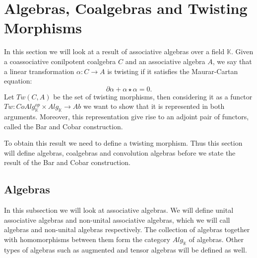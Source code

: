 \documentclass[../../thesis.tex]{subfiles}
\begin{document}
    \section{Algebras, Coalgebras and Twisting Morphisms}

        In this section we will look at a result of associative algebras over a field $\mathbb{K}$. Given a coassociative conilpotent coalgebra $C$ and an associative algebra $A$, we say that a linear transformation $\alpha: C\rightarrow A$ is twisting if it satisfies the Maurar-Cartan equation:
            \begin{equation*}
                \partial\alpha + \alpha\star\alpha = 0.
            \end{equation*}
        Let $Tw(C,A)$ be the set of twisting morphisms, then considering it as a functor $Tw : CoAlg_{\mathbb{K}}^{op}\times Alg_{\mathbb{K}} \rightarrow Ab$ we want to show that it is represented in both arguments. Moreover, this representation give rise to an adjoint pair of functors, called the Bar and Cobar construction.

            \begin{center}
            \end{center}

        To obtain this result we need to define a twisting morphism. Thus this section will define algebras, coalgebras and convolution algebras before we state the result of the Bar and Cobar construction.

        \subsection{Algebras}

            In this subsection we will look at associative algebras. We will define unital associative algebras and non-unital associative algebras, which we will call algebras and non-unital algebras respectively. The collection of algebras together with homomorphisms between them form the category $Alg_{\mathbb{K}}$ of algebras. Other types of algebras such as augmented and tensor algebras will be defined as well.
\end{document}
